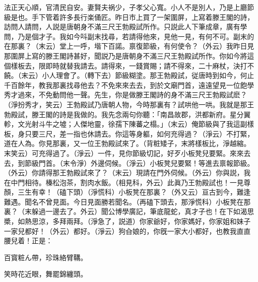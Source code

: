\begin{myquote}
\setlength{\hangindent}{4em}法正天心順，官清民自安。妻賢夫祸少，子孝父心寬。小人不是別人，乃是上廳節級是也。手下管着許多長行楽俑匠。昨日市上買了一架圍屏，上寫着滕王閣的詩，訪問人請問，人説是唐朝身不滿三尺王勃殿試所作。只説此人下筆成章，廣有學問，乃是個才子。我如今呌副末找尋，若請得他來，見他一見，有何不可。副末的在那裏？{\marktext（末云）}堂上一呼，堦下百諾。禀復節級，有何使令？{\marktext（外云）}我昨日見那圍屏上寫的滕王閣詩甚好，聞説乃是唐朝身不滿三尺王勃殿試所作。你如今將這個樣板去，限即時就替我請去。請得來，一錢賞賜；請不得來，二十麻杖，決打不饒。{\marktext（末云）}小人理會了。{\marktext（轉下去）}節級糊塗。那王勃殿試，従唐時到如今，何止千百餘年，教我那裏找尋他去？不免來來去去，到於文廟門首，遠遠望見一位飽學秀才過來，不免動問他一聲。先生，你是做滕王閣詩的身不滿三尺王勃殿試麽？{\marktext（淨扮秀才，笑云）}王勃殿試乃唐朝人物，今時那裏有？試哄他一哄。我就是那王勃殿試，滕王閣的詩是我做的。我先念兩句你聽：「南昌故郡，洪都新府。星分翼軫，文光射斗牛之墟；人傑地靈，徐孺下陳蕃之榻。」{\marktext（末云）}俺節級與了我這副樣板，身只要三尺，差一指也休請去。你這等身軀，如何充得過？{\marktext（淨云）}不打緊，道在人為。你見那裏，又一位王勃殿試來了。{\marktext（背粧矮子，末將樣板比，淨越縮。末笑云）}可充得過了。{\marktext（淨云）}一件，見你節級切記，好歹小板凳兒要緊。來來去去，到節級門首。{\marktext（末令淨）}外邊伺候。{\marktext（淨云）}小板凳兒要緊！等進去禀報節級。{\marktext（外云）}你請得那王勃殿試來了？{\marktext（末云）}現請在門外伺候。{\marktext（外云）}你與説，我在中門相待。榛松泡茶，割肉水飯。{\marktext（相見科，外云）}此眞乃王勃殿試也！一見尊顏，三生有幸！{\marktext（磕下頭）（淨慌科）}小板凳在那裏？{\marktext（外又云）}亘古到今，難逢難遇。聞名不曾見面。今日見面勝若聞名。{\marktext（再磕下頭去，那淨慌科）}小板凳在那裏？{\marktext（末躲過一邊去了。外云）}聞公博學廣記，筆底龍蛇，真才子也！在下如渴思槳，如熱思涼，多拜兩拜。{\marktext（淨急了，説道）}你家爺好，你家媽好，你家姐和妹子一家兒都好！{\marktext（外云）}都好。{\marktext（淨云）}狗㒲娘的，你旣一家大小都好，也教我直直腰兒着！正是：

百寳粧ん帶，珍珠絡臂鞲。

笑時花近眼，舞罷錦纏頭。
\end{myquote}

